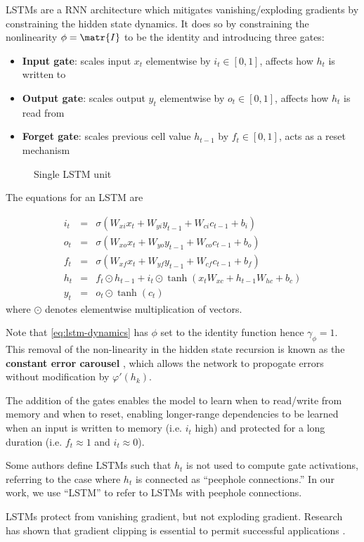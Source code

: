 LSTMs are a RNN architecture which mitigates vanishing/exploding gradients by constraining
the hidden state dynamics. It does so by constraining the nonlinearity $\phi = \matr{I}$ to be the
identity and introducing three gates:
\begin{itemize}
    \item \textbf{Input gate}: scales input $x_t$ elementwise by $i_t \in [0,1]$, affects how $h_t$ is written to
    \item \textbf{Output gate}: scales output $y_t$ elementwise by $o_t \in [0,1]$, affects how $h_t$ is read from
    \item \textbf{Forget gate}: scales previous cell value $h_{t-1}$ by $f_t \in [0,1]$, acts as a reset mechanism
\end{itemize}

\begin{figure}[htpb]
    \centering
    
    \caption{Single LSTM unit}
    \label{fig:lstm-unit}
\end{figure}

The equations for an LSTM are

\begin{eqnarray}
    i_t &=& \sigma(W_{xi} x_t + W_{yi} y_{t-1} + W_{ci} c_{t-1} + b_i) \\
    o_t &=& \sigma(W_{xo} x_t + W_{yo} y_{t-1} + W_{co} c_{t-1} + b_o) \\
    f_t &=& \sigma(W_{xf} x_t + W_{yf} y_{t-1} + W_{cf} c_{t-1} + b_f) \\
    h_t &=& f_t \odot h_{t-1} + i_t \odot \tanh(x_t W_{xc} + h_{t-1} W_{hc} + b_c) \label{eq:lstm-dynamics} \\
    y_t &=& o_t \odot \tanh(c_t)
\end{eqnarray}
where $\odot$ denotes elementwise multiplication of vectors.

Note that \autoref{eq:lstm-dynamics} has $\phi$ set to the identity function
hence $\gamma_\phi = 1$. This removal of the non-linearity in the hidden state
recursion is known as the \textbf{constant error carousel} , which
allows the network to propogate errors without modification by $\varphi'(h_k)$.

The addition of the gates enables the model to learn when to read/write from
memory and when to reset, enabling longer-range dependencies to be learned when
an input is written to memory (i.e. $i_t$ high) and protected for a long
duration (i.e. $f_t \approx 1$ and $i_t \approx 0$).

Some authors define LSTMs such that $h_t$ is not used to compute gate activations,
referring to the case where $h_t$ is connected as ``peephole connections.'' In our
work, we use ``LSTM'' to refer to LSTMs with peephole connections.

LSTMs protect from vanishing gradient, but not exploding gradient. Research has shown
that gradient clipping is essential to permit successful applications \cite{Pascanu2012}.
